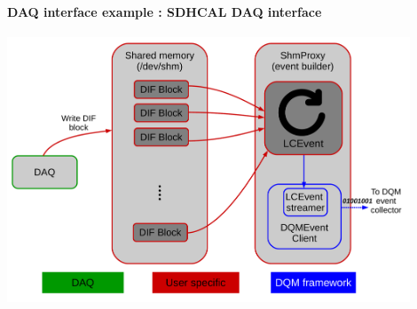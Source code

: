 \documentclass[8pt]{beamer}
\begin{document}
  
  
  
    \begin{frame}
      \frametitle{\secname}
      \framesubtitle{DAQ interface example : SDHCAL DAQ interface}
      \begin{center}
        \includegraphics[width=0.9\textwidth]{figs/sdhcal_dqm_daq.pdf}        
      \end{center}
    \end{frame}
  
%     
%         
\end{document}
